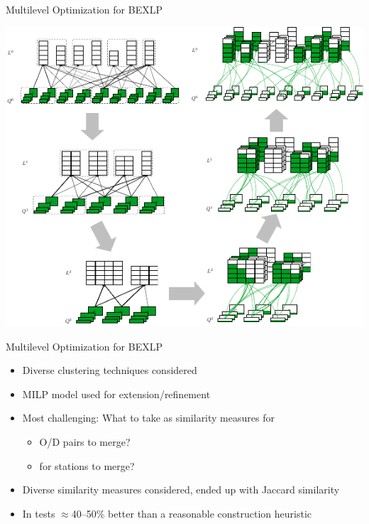 \documentclass[aspectratio=1610]{beamer}
\newcommand{\important}[1]{{\color{green!60!black}#1}}
\begin{document}
\begin{frame}{Multilevel Optimization for BEXLP}
\begin{center}
	\includegraphics[scale=1.0]{graphics/MLR_example.pdf}
\end{center}
\end{frame}	

\begin{frame}{Multilevel Optimization for BEXLP}
\begin{itemize}
	\itemsep3ex
	\item Diverse clustering techniques considered
	\item MILP model used for extension/refinement
	\item Most challenging: What to take as \important{similarity measures} for
	\begin{itemize}
		\item O/D pairs to merge?
		\item for stations to merge?
	\end{itemize}
	\item Diverse similarity measures considered, ended up with Jaccard similarity
	\item In tests \important{$\approx$40--50\% better} than a reasonable construction heuristic
\end{itemize}
\end{frame}
\end{document}
